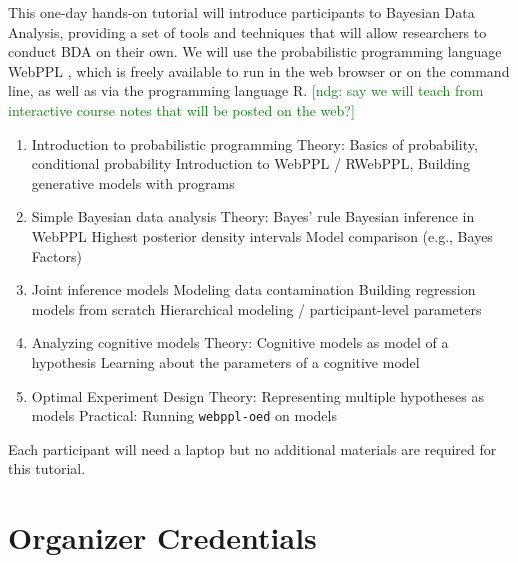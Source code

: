\documentclass[10pt,letterpaper]{article}
\newcommand{\ndg}[1]{\textcolor{green}{[ndg: #1]}}
\providecommand{\tightlist}{%
  \setlength{\itemsep}{0pt}\setlength{\parskip}{0pt}}
\begin{document}
This one-day hands-on tutorial will introduce participants to Bayesian Data Analysis, providing a set of tools and techniques that will allow researchers to conduct BDA on their own. 
We will use the probabilistic programming language WebPPL \cite{dippl}, which is freely available to run in the web browser or on the command line, as well as via the programming language R.  
\ndg{say we will teach from interactive course notes that will be posted on the web?}

\begin{enumerate}
\tightlist
\item Introduction to probabilistic programming
	\subitem Theory: Basics of probability, conditional probability
	\subitem Introduction to WebPPL / RWebPPL, 
	\subitem Building generative models with programs
\item Simple Bayesian data analysis
	\subitem Theory: Bayes' rule
	\subitem Bayesian inference in WebPPL
	\subitem Highest posterior density intervals
	\subitem Model comparison (e.g., Bayes Factors)
\item Joint inference models
	\subitem Modeling data contamination
	\subitem Building regression models from scratch 
	\subitem Hierarchical modeling  / participant-level parameters
\item Analyzing cognitive models
	\subitem Theory: Cognitive models as model of a hypothesis
	\subitem Learning about the parameters of a cognitive model
\item Optimal Experiment Design
	\subitem Theory: Representing multiple hypotheses as models 
	\subitem Practical: Running \texttt{webppl-oed} on models
\end{enumerate}

Each participant will need a laptop but no additional materials are required for this tutorial. 

\section{Organizer Credentials}
\end{document}
